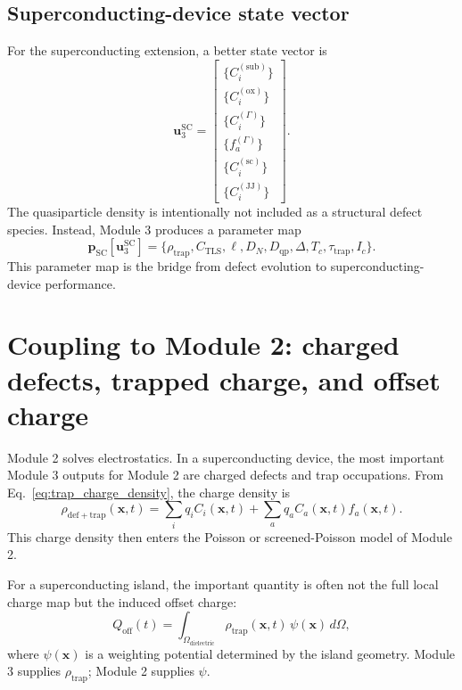 \documentclass[11pt]{article}
\newcommand{\x}{\mathbf{x}}
\begin{document}
\subsection{Superconducting-device state vector}

For the superconducting extension, a better state vector is
\begin{equation}
\mathbf{u}_{3}^{\mathrm{SC}}
=\left[
\begin{array}{c}
\{C_i^{(\mathrm{sub})}\}\\
\{C_i^{(\mathrm{ox})}\}\\
\{C_i^{(\Gamma)}\}\\
\{f_a^{(\Gamma)}\}\\
\{C_i^{(\mathrm{sc})}\}\\
\{C_i^{(\mathrm{JJ})}\}
\end{array}
\right].
\label{eq:sc_state_vector}
\end{equation}
The quasiparticle density is intentionally not included as a structural defect species. Instead, Module 3 produces a parameter map
\begin{equation}
\mathbf{p}_{\mathrm{SC}}[\mathbf{u}_{3}^{\mathrm{SC}}]
=\{\rho_{\mathrm{trap}},C_{\mathrm{TLS}},\ell,D_N,D_{\mathrm{qp}},\Delta,T_c,\tau_{\mathrm{trap}},I_c\}.
\label{eq:parameter_output}
\end{equation}
This parameter map is the bridge from defect evolution to superconducting-device performance.

\section{Coupling to Module 2: charged defects, trapped charge, and offset charge}

Module 2 solves electrostatics. In a superconducting device, the most important Module 3 outputs for Module 2 are charged defects and trap occupations. From Eq.~\eqref{eq:trap_charge_density}, the charge density is
\begin{equation}
\rho_{\mathrm{def+trap}}(\x,t)=\sum_i q_i C_i(\x,t)+\sum_a q_a C_a(\x,t) f_a(\x,t).
\label{eq:rho_def_trap_m3}
\end{equation}
This charge density then enters the Poisson or screened-Poisson model of Module 2.

For a superconducting island, the important quantity is often not the full local charge map but the induced offset charge:
\begin{equation}
Q_{\mathrm{off}}(t)=\int_{\Omega_{\mathrm{dielectric}}} \rho_{\mathrm{trap}}(\x,t)\,\psi(\x)\,d\Omega,
\label{eq:qoff_weighting}
\end{equation}
where $\psi(\x)$ is a weighting potential determined by the island geometry. Module 3 supplies $\rho_{\mathrm{trap}}$; Module 2 supplies $\psi$.
\end{document}
